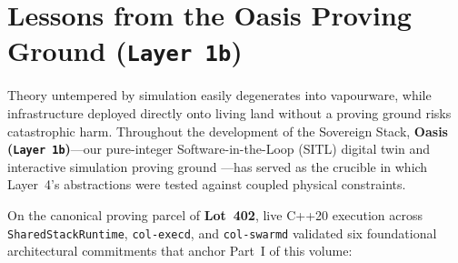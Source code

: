 \section*{Lessons from the Oasis Proving Ground (\texttt{Layer 1b})}

Theory untempered by simulation easily degenerates into vapourware, while infrastructure
deployed directly onto living land without a proving ground risks catastrophic harm.
Throughout the development of the Sovereign Stack, \textbf{Oasis (\texttt{Layer 1b})}---our
pure-integer Software-in-the-Loop (SITL) digital twin and interactive simulation proving
ground \parencite{grieves2014digital}---has served as the crucible in which Layer~4's
abstractions were tested against coupled physical constraints.

On the canonical proving parcel of \textbf{Lot~402}, live C++20 execution across
\texttt{SharedStackRuntime}, \texttt{col-execd}, and \texttt{col-swarmd} validated six
foundational architectural commitments that anchor Part~I of this volume:

